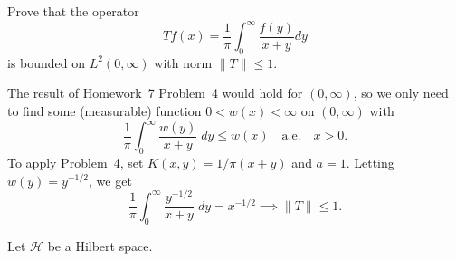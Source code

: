 \documentclass[11pt,letterpaper]{article}
\def\H{\mathcal{H}}
\begin{document}
\begin{problem}
    Prove that the operator
\[
Tf(x) = \frac1\pi\int_0^\infty \frac{f(y)}{x+y}dy
\]
is bounded on $L^2(0,\infty)$ with norm $\|T\| \leq 1$.
\end{problem}

\begin{solution}
    The result of Homework~7 Problem~4 would hold for $(0,\infty)$, so we only need to find some (measurable) function $0<w(x)<\infty$ on $(0,\infty)$ with
    \[
        \frac{1}{\pi}\int_0^\infty \frac{w(y)}{x+y}\;dy\leq w(x)\quad\text{a.e.}\quad x>0
    .\] 
    To apply Problem~4, set $K(x,y)=1 / \pi(x+y)$ and $a=1$. Letting $w(y)=y^{-1 /2}$, we get
    \[
        \frac{1}{\pi}\int_0^\infty \frac{y^{-1/2}}{x+y}\;dy = x^{-1 /2} \implies \|T\|\leq 1
    .\]  
\end{solution}

\begin{problem}
    Let $\H$ be a Hilbert space.
\end{problem} 
\end{document}

